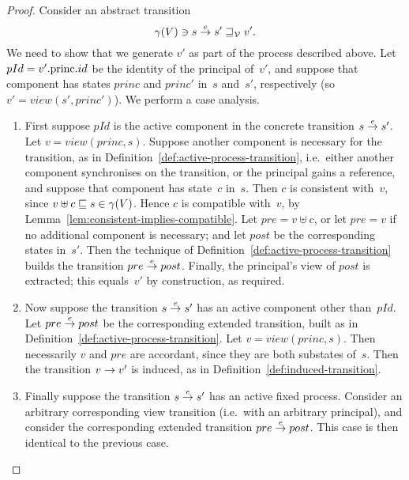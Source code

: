\begin{proof} 
Consider an abstract transition
\[
\gamma(V) \ni s \stackrel{e}\rightarrow s' \sqsupseteq_{\mathcal{V}} v'.
\]
We need to show that we generate $v'$ as part of the process described above.
Let $pId = v'.\mathrm{princ}.id$ be the identity of the principal of~$v'$, and suppose
that component has states $princ$ and $princ'$ in~$s$ and~$s'$, respectively
(so $v' = view(s', princ')$).  We perform a case analysis.
%
\begin{enumerate}
\item
First suppose $pId$ is the active component in the concrete transition
\( {s \stackrel{e}\rightarrow s'} \).
Let $v = view(princ, s)$.  
%
Suppose another component is necessary for the transition, as in
Definition~\ref{def:active-process-transition}, i.e.~either another component
synchronises on the transition, or the principal gains a reference, and
suppose that component has state~$c$ in~$s$.  Then $c$ is consistent
with~$v$, since $v \uplus c \sqsubseteq s \in \gamma(V)$.  Hence $c$ is compatible
with~$v$, by Lemma~\ref{lem:consistent-implies-compatible}.
%
Let $pre = v \uplus c$, or let $pre = v$ if no additional component is
necessary; and let $post$ be the corresponding states in~$s'$.  Then the
technique of Definition~\ref{def:active-process-transition} builds the
transition \( pre \stackrel{e}\rightarrow post \).  Finally, the principal's view of $post$
is extracted; this equals~$v'$ by construction, as required. 


\item
Now suppose the transition $s \stackrel{e}\rightarrow s'$ has an active component other
than~$pId$.  Let $pre \stackrel{e}\rightarrow post$ be the corresponding extended
transition, built as in Definition~\ref{def:active-process-transition}.  Let
$v = view(princ, s)$.  Then necessarily $v$ and $pre$ are accordant, since
they are both substates of~$s$.  Then the transition $v \stackrel{}\rightarrow v'$ is
induced, as in Definition~\ref{def:induced-transition}.

\item\label{step:abs-trans-correct-3}
Finally suppose the transition $s \stackrel{e}\rightarrow s'$ has an active fixed process.
Consider an arbitrary corresponding view transition (i.e.~with an arbitrary
principal), and consider the corresponding extended transition $pre \stackrel{e}\rightarrow
post$.  This case is then identical to the previous case.
\end{enumerate}
\end{proof}


